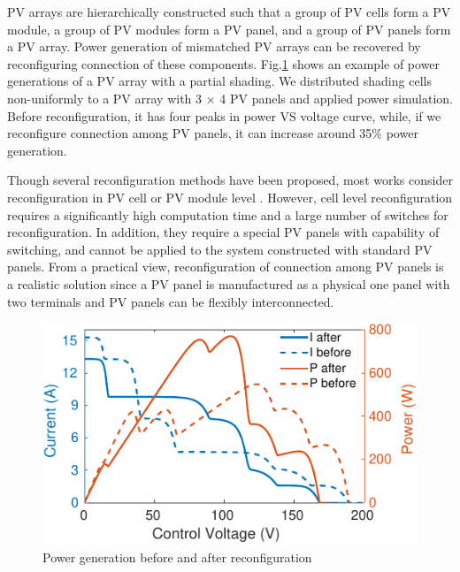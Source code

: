 \documentclass[conference]{pvsctran}
\begin{document}
PV arrays are hierarchically constructed such that a group of PV cells form a PV module, a group of PV modules form a PV panel, and a group of PV panels form a PV array. 
Power generation of mismatched PV arrays can be recovered by reconfiguring connection of these components. 
Fig.\ref{compare} shows an example of power generations of a PV array with a partial shading. 
We distributed shading cells non-uniformly to a PV array with 3 $\times$  4 PV panels and applied power simulation. 
Before reconfiguration, it has four peaks in power VS voltage curve, while,  if we reconfigure connection among PV panels, it can increase around 35\% power generation.

Though several reconfiguration methods have been proposed, most works consider reconfiguration in PV cell or PV module level \cite{nguyen2008adaptive,wang2014architecture,storey2013improved,storey2014optimized,udenze2018reconfiguration}. 
However, cell level reconfiguration requires a significantly high computation time and a large number of switches for reconfiguration. 
In addition, they require a special PV panels with capability of switching, and cannot be applied to the system constructed with standard PV panels. 
From a practical view, reconfiguration of connection among PV panels is a realistic solution since a PV panel is manufactured as a physical one panel with two terminals and PV panels can be flexibly interconnected. 
\begin{figure}[t]
    \centering
    \includegraphics[width=0.8\linewidth]{PVSC-46/fig/compare.png}
    \caption{Power generation before and after reconfiguration}
    \label{compare}
\end{figure}
\end{document}
